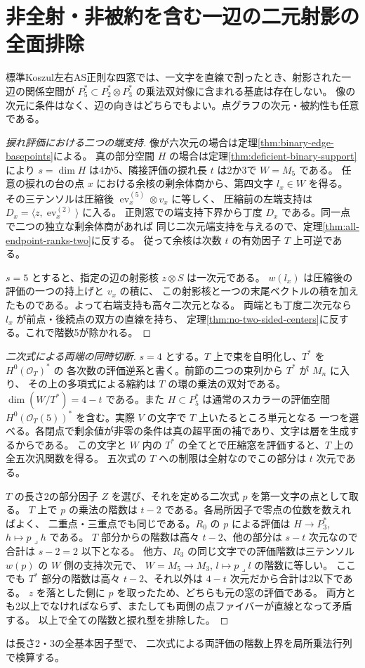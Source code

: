 \section{非全射・非被約を含む一辺の二元射影の全面排除}
\label{sec:deficient-binary-quintic-pencil}
\begin{theorem}\label{thm:deficient-binary-quintic-pencil}
標準Koszul左右AS正則な四窓では、一文字を直線で割ったとき、射影された一辺の関係空間が
$P_5^*\subset P_2^*\otimes P_3^*$ の乗法双対像に含まれる基底は存在しない。
像の次元に条件はなく、辺の向きはどちらでもよい。点グラフの次元・被約性も任意である。
\end{theorem}
\begin{proof}[捩れ評価における二つの端支持]
像が六次元の場合は定理\ref{thm:binary-edge-basepoints}による。
真の部分空間 $H$ の場合は定理\ref{thm:deficient-binary-support}により
$s=\dim H$ は4か5、隣接評価の捩れ長 $t$ は2か3で $W=M_5$ である。
任意の捩れの台の点 $x$ における余核の剰余体商から、第四文字 $l_x\in W$ を得る。
その三テンソルは圧縮後 $\operatorname{ev}_x^{(5)}\otimes v_x$ に等しく、
圧縮前の左端支持は $D_x=\langle z,\operatorname{ev}_x^{(2)}\rangle$ に入る。
正則窓での端支持下界から丁度 $D_x$ である。同一点で二つの独立な剰余体商があれば
同じ二次元端支持を与えるので、定理\ref{thm:all-endpoint-ranks-two}に反する。
従って余核は次数 $t$ の有効因子 $T$ 上可逆である。

$s=5$ とすると、指定の辺の射影核 $z\otimes S$ は一次元である。
$w(l_x)$ は圧縮後の評価の一つの持上げと $v_x$ の積に、
この射影核と一つの末尾ベクトルの積を加えたものである。よって右端支持も高々二次元となる。
両端とも丁度二次元なら $l_x$ が前点・後続点の双方の直線を持ち、
定理\ref{thm:no-two-sided-centers}に反する。これで階数5が除かれる。
\end{proof}
\begin{proof}[二次式による両端の同時切断]
$s=4$ とする。$T$ 上で束を自明化し、$T^*$ を $H^0(\mathcal O_T)^*$ の
各次数の評価逆系と書く。前節の二つの束列から $T^*$ が $M_n$ に入り、
その上の多項式による縮約は $T$ の環の乗法の双対である。
$\dim(W/T^*)=4-t$ である。また $H\subset P_5^*$ は通常のスカラーの評価空間
$H^0(\mathcal O_T(5))^*$ を含む。実際 $V$ の文字で $T$ 上いたるところ単元となる
一つを選べる。各閉点で剰余値が非零の条件は真の超平面の補であり、文字は層を生成するからである。
この文字と $W$ 内の $T^*$ の全てとで圧縮窓を評価すると、$T$ 上の全五次汎関数を得る。
五次式の $T$ への制限は全射なのでこの部分は $t$ 次元である。

$T$ の長さ2の部分因子 $Z$ を選び、それを定める二次式 $p$ を第一文字の点として取る。
$T$ 上で $p$ の乗法の階数は $t-2$ である。各局所因子で零点の位数を数えればよく、
二重点・三重点でも同じである。$R_0$ の $p$ による評価は
$H\to P_3^*$, $h\mapsto p\mathbin{\lrcorner}h$ である。
$T$ 部分からの階数は高々 $t-2$、他の部分は $s-t$ 次元なので合計は $s-2=2$ 以下となる。
他方、$R_3$ の同じ文字での評価階数は三テンソル $w(p)$ の $W$ 側の支持次元で、
$W=M_5\to M_3$, $l\mapsto p\mathbin{\lrcorner}l$ の階数に等しい。
ここでも $T^*$ 部分の階数は高々 $t-2$、それ以外は $4-t$ 次元だから合計は2以下である。
$z$ を落とした側に $p$ を取ったため、どちらも元の窓の評価である。
両方とも2以上でなければならず、またしても両側の点ファイバーが直線となって矛盾する。
以上で全ての階数と捩れ型を排除した。
\end{proof}
は長さ2・3の全基本因子型で、
二次式による両評価の階数上界を局所乗法行列で検算する。
